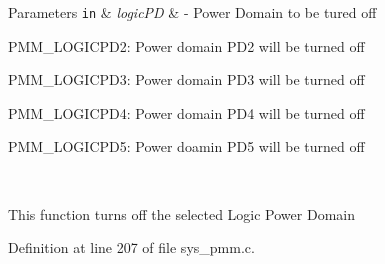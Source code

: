 \begin{DoxyParams}[1]{Parameters}
\mbox{\tt in}  & {\em logic\+PD} & -\/ Power Domain to be tured off
\begin{DoxyItemize}
\item P\+M\+M\+\_\+\+L\+O\+G\+I\+C\+P\+D2\+: Power domain P\+D2 will be turned off
\item P\+M\+M\+\_\+\+L\+O\+G\+I\+C\+P\+D3\+: Power domain P\+D3 will be turned off
\item P\+M\+M\+\_\+\+L\+O\+G\+I\+C\+P\+D4\+: Power domain P\+D4 will be turned off
\item P\+M\+M\+\_\+\+L\+O\+G\+I\+C\+P\+D5\+: Power doamin P\+D5 will be turned off
\end{DoxyItemize}\\
\hline
\end{DoxyParams}
This function turns off the selected Logic Power Domain 

Definition at line 207 of file sys\+\_\+pmm.\+c.


